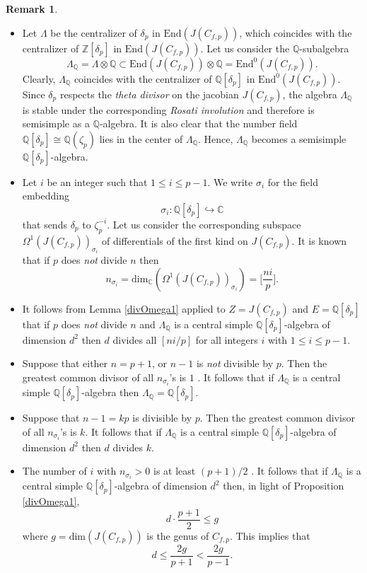\documentclass[12pt,a4paper,reqno]{amsart}
\def\Q{{\mathbb Q}}
\def\Z{{\mathbb Z}}
\def\C{{\mathbb C}}
\def\End{\mathrm{End}}
\def\dim{\mathrm{dim}}
\theoremstyle{definition}
\newtheorem{rem}[thm]{Remark}
\begin{document}
\begin{rem}
 \label{ssLambda}
 \begin{itemize}
 \item[(i)]
 Let $\Lambda$ be the centralizer of $\delta_p$ in  $\End(J(C_{f,p}))$, which coincides with the centralizer
 of $\Z[\delta_p]$ in  $\End(J(C_{f,p}))$.
 Let us consider the $\Q$-subalgebra
 $$\Lambda_{\Q}=\Lambda\otimes\Q\subset \End(J(C_{f,p}))\otimes\Q=\End^0(J(C_{f,p})).$$
  Clearly, $\Lambda_{\Q}$ coincides with the centralizer of
$\Q[\delta_p]$ in $\End^0(J(C_{f,p}))$. Since $\delta_p$ respects the {\sl theta
 divisor} on the jacobian $J(C_{f,p})$, the algebra $\Lambda_{\Q}$ is stable
under the corresponding {\sl Rosati involution} and therefore is
semisimple as a $\Q$-algebra. It is also clear that  the number field $\Q[\delta_p]\cong \Q(\zeta_p)$ lies in the center of $\Lambda_{\Q}$.
Hence, $\Lambda_{\Q}$ becomes a semisimple $\Q[\delta_p]$-algebra.
\item[(ii)]
Let $i$ be an integer such that $1 \le i \le p-1$. We write $\sigma_i$ for the field embedding
$$\sigma_i:\Q[\delta_p]\hookrightarrow \C$$
that sends $\delta_p$ to $\zeta_p^{-i}$. Let us consider the corresponding subspace $\Omega^1(J(C_{f,p}))_{\sigma_i}$ of differentials of the first kind on $J(C_{f,p})$.
It is known \cite[Remark 3.7]{ZarhinCambridge} that if $p$ does {\sl not} divide $n$ then
\begin{equation}
\label{niSigma}
n_{\sigma_i}=\dim_{\C}(\Omega^1(J(C_{f,p}))_{\sigma_i})=\big[\frac{ni}{p}\big].
\end{equation}
\item[(iii)] It follows from Lemma \ref{divOmega1} applied to $Z=J(C_{f,p})$ and $E=\Q[\delta_p]$ that
if $p$ does {\sl not} divide $n$ and
$\Lambda_{\Q}$ is a central simple $\Q[\delta_p]$-algebra of dimension $d^2$ then $d$ divides all $[ni/p]$ for all
integers $i$ with $1\le i \le p-1$.
\item[(iv)]    Suppose that either $n=p+1$,  or $n-1$ is {\sl not} divisible by $p$. Then the greatest common divisor of all $n_{\sigma_i}$'s is $1$
\cite[Lemma 8.1(D) on p. 516--517]{ZarhinGanita}.
 It follows that if $\Lambda_{\Q}$ is a central simple $\Q[\delta_p]$-algebra
then $\Lambda_{\Q}=\Q[\delta_p]$.
\item[(v)]    Suppose that $n-1=kp$ is  divisible by $p$. Then the greatest common divisor of all $n_{\sigma_i}$'s is $k$.
\cite[Lemma 8.1(D) on p. 516--517]{ZarhinGanita}
 It follows that if $\Lambda_{\Q}$ is a central simple $\Q[\delta_p]$-algebra of dimension $d^2$ then $d$ divides $k$.

\item[(vi)]  The number of $i$ with $n_{\sigma_i}>0$ is at least $(p+1)/2$ \cite[p. 101]{ZarhinCrelle}.  It follows that if $\Lambda_{\Q}$ is a central simple $\Q[\delta_p]$-algebra of dimension $d^2$
then, in light of Proposition \ref{divOmega1},
$$d\cdot \frac{p+1}{2}\le g$$
where $g=\dim(J(C_{f,p}))$ is the genus of $C_{f,p}$.  This implies that
$$d\le \frac{2g}{p+1}< \frac{2g}{p-1}.$$
\end{itemize}
 \end{rem}
\end{document}
